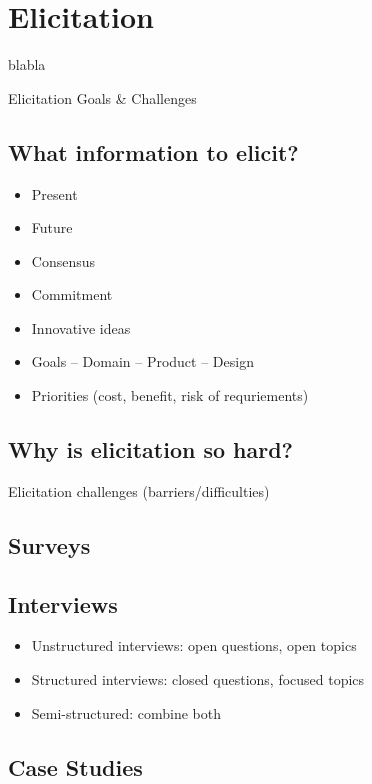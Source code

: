 
\chapter{Elicitation}%
blabla


Elicitation Goals \& Challenges%

\section{What information to elicit?}

\begin{itemize}
  \item Present
  \item Future 
  \item Consensus 
  \item Commitment 
  \item Innovative ideas
  \item Goals -- Domain -- Product -- Design
  \item Priorities (cost, benefit, risk of requriements)
\end{itemize}

\section{Why is elicitation so hard?}

Elicitation challenges (barriers/difficulties) 

\section{Surveys}

\section{Interviews}

\begin{itemize}
\item Unstructured interviews: open questions, open topics
\item Structured interviews: closed questions, focused topics
\item Semi-structured: combine both
\end{itemize}


\section{Case Studies}

